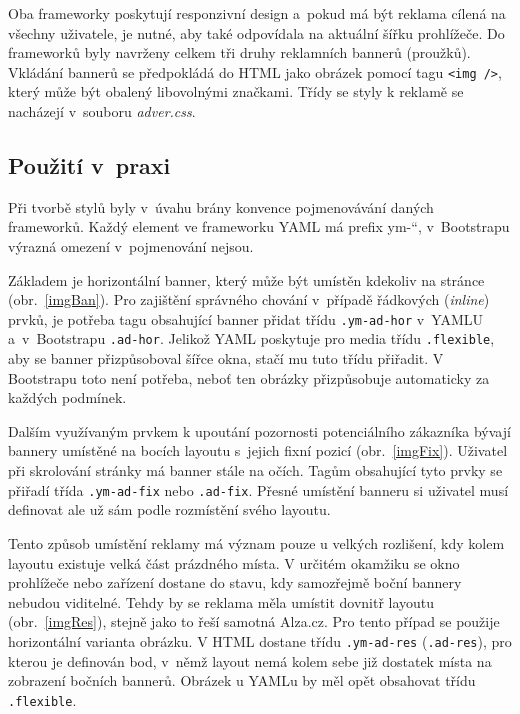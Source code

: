 \documentclass[thesis=B,czech]{FITthesis}[2012/06/26]
\begin{document}
Oba frameworky poskytují responzivní design a~pokud má být reklama cílená na všechny uživatele, je nutné, aby také odpovídala na aktuální šířku prohlížeče. Do frameworků byly navrženy celkem tři druhy reklamních bannerů (proužků). Vkládání bannerů se předpokládá do \gls{HTML} jako obrázek pomocí tagu \verb#<img />#, který může být obalený libovolnými značkami. Třídy se styly k reklamě se nacházejí v~souboru \textit{adver.css}.

\subsection{Použití v~praxi}
Při tvorbě stylů byly v~úvahu brány konvence pojmenovávání daných frameworků. Každý element ve frameworku \gls{YAML} má prefix \quotedblbase ym-\textquotedblleft , v~Bootstrapu výrazná omezení v~pojmenování nejsou. 

Základem je horizontální banner, který může být umístěn kdekoliv na stránce (obr.~\ref{imgBan}). Pro zajištění správného chování v~případě řádkových (\textit{inline}) prvků, je potřeba tagu obsahující banner přidat třídu \verb#.ym-ad-hor# v~\gls{YAML}U a~v~Bootstrapu \verb#.ad-hor#. Jelikož \gls{YAML} poskytuje pro media třídu \verb#.flexible#, aby se banner přizpůsoboval šířce okna, stačí mu tuto třídu přiřadit. V Bootstrapu toto není potřeba, neboť ten obrázky přizpůsobuje automaticky za každých podmínek.



Dalším využívaným prvkem k upoutání pozornosti potenciálního zákazníka bývají bannery umístěné na bocích layoutu s~jejich fixní pozicí (obr.~\ref{imgFix}). Uživatel při skrolování stránky má banner stále na očích. Tagům obsahující tyto prvky se přiřadí třída \verb#.ym-ad-fix# nebo \verb#.ad-fix#. Přesné umístění banneru si uživatel musí definovat ale už sám podle rozmístění svého layoutu. 


Tento způsob umístění reklamy má význam pouze u velkých rozlišení, kdy kolem layoutu existuje velká část prázdného místa. V určitém okamžiku se okno prohlížeče nebo zařízení dostane do stavu, kdy samozřejmě boční bannery nebudou viditelné. Tehdy by se reklama měla umístit dovnitř layoutu (obr.~\ref{imgRes}), stejně jako to řeší samotná Alza.cz. Pro tento případ se použije horizontální varianta obrázku. V \gls{HTML} dostane třídu \verb#.ym-ad-res# (\verb#.ad-res#), pro kterou je definován bod, v~němž layout nemá kolem sebe již dostatek místa na zobrazení bočních bannerů. Obrázek u \gls{YAML}u by měl opět obsahovat třídu \verb#.flexible#.
\end{document}
